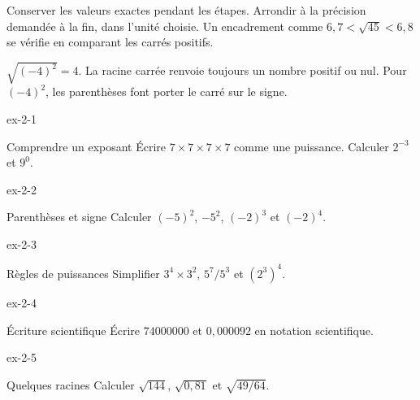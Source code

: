 \begin{savoirfaire}Conserver les valeurs exactes pendant les étapes. Arrondir à la précision demandée à la fin, dans l’unité choisie. Un encadrement comme $6{,}7<\sqrt{45}<6{,}8$ se vérifie en comparant les carrés positifs.\end{savoirfaire}
\begin{attention}$\sqrt{(-4)^2}=4$. La racine carrée renvoie toujours un nombre positif ou nul. Pour $(-4)^2$, les parenthèses font porter le carré sur le signe.\end{attention}
\clearpage{}
\begin{blocLivre}{ex-2-1}\begin{exercice}[1]{Comprendre un exposant}
Écrire $7\times7\times7\times7$ comme une puissance. Calculer $2^{-3}$ et $9^0$.
\end{exercice}\end{blocLivre}
\begin{blocLivre}{ex-2-2}\begin{exercice}[1]{Parenthèses et signe}
Calculer $(-5)^2$, $-5^2$, $(-2)^3$ et $(-2)^4$.
\end{exercice}\end{blocLivre}
\begin{blocLivre}{ex-2-3}\begin{exercice}[1]{Règles de puissances}
Simplifier $3^4\times3^2$, $5^7/5^3$ et $(2^3)^4$.
\end{exercice}\end{blocLivre}
\begin{blocLivre}{ex-2-4}\begin{exercice}[1]{Écriture scientifique}
Écrire $74000000$ et $0{,}000092$ en notation scientifique.
\end{exercice}\end{blocLivre}
\begin{blocLivre}{ex-2-5}\begin{exercice}[1]{Quelques racines}
Calculer $\sqrt{144}$, $\sqrt{0{,}81}$ et $\sqrt{49/64}$.
\end{exercice}\end{blocLivre}

